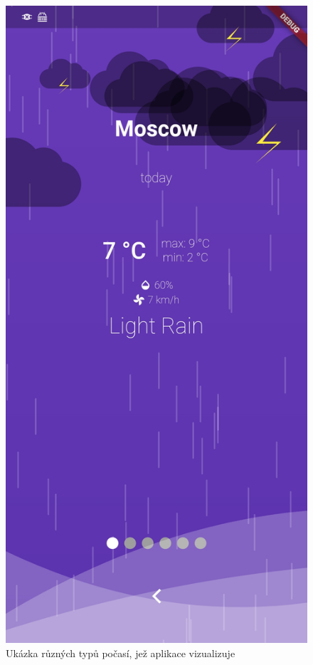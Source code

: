 \documentclass[12pt, a4paper]{article}
\begin{document}
\begin{figure}[!htb]
  \includegraphics[width=\linewidth]{img/app-thunder.jpg}
\endminipage

  \caption{Ukázka různých typů počasí, jež aplikace vizualizuje}\label{fig:awesome_image1}
\end{figure}
\end{document}
